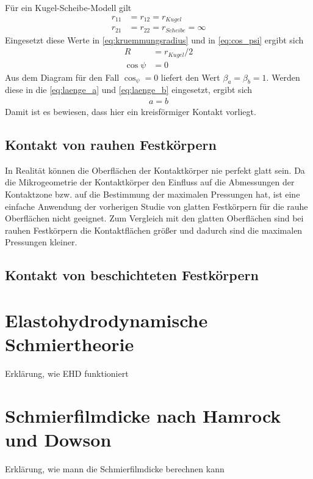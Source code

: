 Für ein Kugel-Scheibe-Modell gilt
%
\begin{align*}
    r_{11} &= r_{12} = r_{Kugel} \\
    r_{21} &= r_{22} = r_{Scheibe} = \infty
\end{align*}
%
Eingesetzt diese Werte in \ref{eq:kruemmungsradius} und in \ref{eq:cos_psi} ergibt sich 
%
\begin{align*}
    R &= r_{Kugel}/2 \\
    \cos{\psi} &= 0
\end{align*}
%
Aus dem Diagram für den Fall $\cos_{\psi} = 0$ liefert den Wert $\beta_a = \beta_b = 1$.
Werden diese in die \ref{eq:laenge_a} und \ref{eq:laenge_b} eingesetzt, ergibt sich
%
\begin{align*}
    a = b
\end{align*}
%
Damit ist es bewiesen, dass hier ein kreisförmiger Kontakt vorliegt.

\subsection{Kontakt von rauhen Festkörpern}
\label{sub:kontakt_von_rauhen_festkoerpern}
In Realität können die Oberflächen der Kontaktkörper nie perfekt glatt sein.
Da die Mikrogeometrie der Kontaktkörper den Einfluss auf die Abmessungen der Kontaktzone bzw. auf die Bestimmung der maximalen Pressungen hat, ist eine einfache Anwendung der vorherigen Studie von glatten Festkörpern für die rauhe Oberflächen nicht geeignet.
Zum Vergleich mit den glatten Oberflächen sind bei rauhen Festkörpern die Kontaktflächen größer und dadurch sind die maximalen Pressungen kleiner.

\subsection{Kontakt von beschichteten Festkörpern}
\label{sub:kontakt_von_beschichteten_Festkoerpern}

\section{Elastohydrodynamische Schmiertheorie}
\label{elastohydrodynamische_schmiertheorie}

Erklärung, wie EHD funktioniert

\section{Schmierfilmdicke nach Hamrock und Dowson}
\label{sec:schmierfilmdicke_nach_hamrock_und_dowson}
Erklärung, wie mann die Schmierfilmdicke berechnen kann

